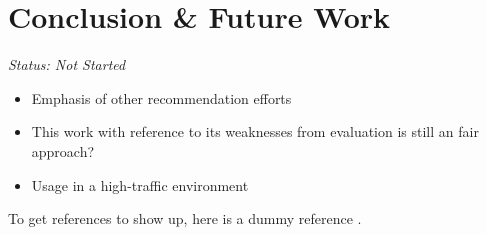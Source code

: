 \chapter{Conclusion \& Future Work}

\emph{Status: Not Started}

\begin{itemize}
\item Emphasis of other recommendation efforts
\item This work with reference to its weaknesses from evaluation is still an fair approach?
\item Usage in a high-traffic environment
\end{itemize}

To get references to show up, here is a dummy reference \citet{anand03}.